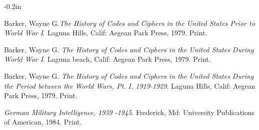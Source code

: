 \documentclass{article}
\begin{document}
\newpage
\begin{thebibliography}{100} %
\addtolength{\itemindent} {-0.2in}

 Barker, Wayne G.\emph{The History of Codes and Ciphers in the United States Prior to World War I}. Laguna Hills, Calif: Aegean Park Press, 1979. Print.

 Barker, Wayne G. \emph{The History of Codes and Ciphers in the United States During World War I}. 
Laguna beach, Calif: Aegean Park Press, 1979. Print.

 Barker, Wayne G. \emph{The History of Codes and Ciphers in the United States During the Period between the World Wars, Pt. I. 1919-1929}. Laguna Hills, Calif: Aegean Park Press, 1979. Print.

 \emph{German Military Intelligence, 1939 -1945}. Frederick, Md: University Publications of American, 1984. Print.

\end{thebibliography}
\end{document}
